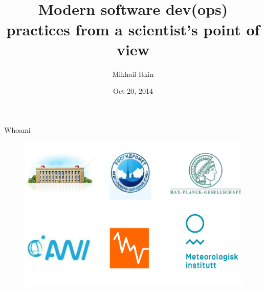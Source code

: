 \documentclass{beamer}
\title[Klækken, 20.-21.10.2014]{\\Modern software dev(ops) practices \newline from a scientist's point of view}
\author{Mikhail Itkin}
\institute{Istjenesten, VNN (Tromsø)}
\date{Oct 20, 2014}
\begin{document}
\begin{frame}
    \titlepage
\end{frame}

\begin{frame}{Whoami}
    \begin{figure}
        \includegraphics{img/whoami.png}
       \end{figure}
\end{frame}
\end{document}
